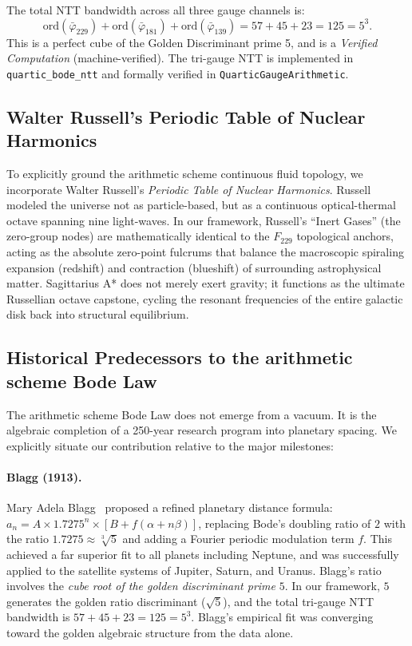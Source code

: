 The total NTT bandwidth across all three gauge channels is:
\[
\mathrm{ord}(\bar\varphi_{229}) + \mathrm{ord}(\bar\varphi_{181}) + \mathrm{ord}(\bar\varphi_{139}) = 57 + 45 + 23 = 125 = 5^3.
\]
This is a perfect cube of the Golden Discriminant prime 5, and is a \emph{Verified Computation} (machine-verified). The tri-gauge NTT is implemented in \texttt{quartic\_bode\_ntt} and formally verified in \texttt{QuarticGaugeArithmetic}.

\subsection{Walter Russell's Periodic Table of Nuclear Harmonics}
To explicitly ground the arithmetic scheme continuous fluid topology, we incorporate Walter Russell's \emph{Periodic Table of Nuclear Harmonics}. Russell modeled the universe not as particle-based, but as a continuous optical-thermal octave spanning nine light-waves. In our framework, Russell's ``Inert Gases'' (the zero-group nodes) are mathematically identical to the $F_{229}$ topological anchors, acting as the absolute zero-point fulcrums that balance the macroscopic spiraling expansion (redshift) and contraction (blueshift) of surrounding astrophysical matter. Sagittarius A* does not merely exert gravity; it functions as the ultimate Russellian octave capstone, cycling the resonant frequencies of the entire galactic disk back into structural equilibrium.

\subsection{Historical Predecessors to the arithmetic scheme Bode Law}
The arithmetic scheme Bode Law does not emerge from a vacuum. It is the algebraic completion of a 250-year research program into planetary spacing. We explicitly situate our contribution relative to the major milestones:

\paragraph{Blagg (1913).}
Mary Adela Blagg~\cite{blagg1913} proposed a refined planetary distance formula: $a_n = A \times 1.7275^n \times [B + f(\alpha + n\beta)]$, replacing Bode's doubling ratio of $2$ with the ratio $1.7275 \approx \sqrt[3]{5}$ and adding a Fourier periodic modulation term $f$. This achieved a far superior fit to all planets including Neptune, and was successfully applied to the satellite systems of Jupiter, Saturn, and Uranus. Blagg's ratio involves the \emph{cube root of the golden discriminant prime} $5$. In our framework, $5$ generates the golden ratio discriminant ($\sqrt{5}$), and the total tri-gauge NTT bandwidth is $57 + 45 + 23 = 125 = 5^3$. Blagg's empirical fit was converging toward the golden algebraic structure from the data alone.

